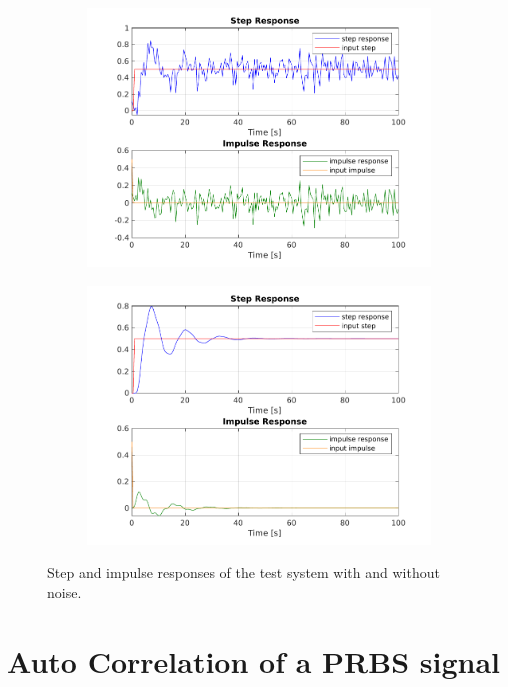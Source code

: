 \documentclass{scrartcl}
\begin{document}
\begin{figure}[h]
	\centering
	\begin{subfigure}{0.49\textwidth}
		\includegraphics[width=\textwidth]{figures/noisy_responses.pdf}
	\end{subfigure}
	\begin{subfigure}{0.49\textwidth}
		\includegraphics[width=\textwidth]{figures/noisefree.pdf}
	\end{subfigure}
	\caption{Step and impulse responses of the test system with and without noise.}\label{fig:responses}
\end{figure}

\section{Auto Correlation of a PRBS signal}
\end{document}
